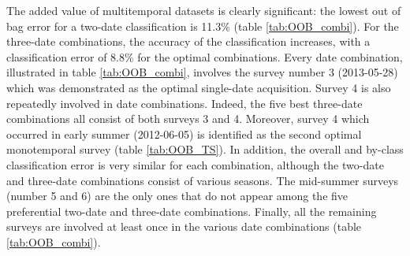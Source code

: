 \documentclass[remotesensing,article,submit,moreauthors,pdftex,12pt,a4paper]{mdpi} %
\begin{document}
The added value of multitemporal datasets is clearly significant: the lowest out of bag error for a two-date classification is 11.3\% (table \ref{tab:OOB_combi}). 
For the three-date combinations, the accuracy of the classification increases, with a classification error of 8.8\% for the optimal combinations.
Every date combination, illustrated in table \ref{tab:OOB_combi}, involves the survey number 3 (2013-05-28) which was demonstrated as the optimal single-date acquisition.  
Survey 4 is also repeatedly involved in date combinations. 
Indeed, the five best three-date combinations all consist of both surveys 3 and 4. 
Moreover, survey 4 which occurred in early summer (2012-06-05) is identified as the second optimal monotemporal survey (table \ref{tab:OOB_TS}). 
In addition, the overall and by-class classification error is very similar for each combination, although the two-date and three-date combinations consist of various seasons. 
The mid-summer surveys (number 5 and 6) are the only ones that do not appear among the five preferential two-date and three-date combinations. 
Finally, all the remaining surveys are involved at least once in the various date combinations (table \ref{tab:OOB_combi}).
\end{document}

